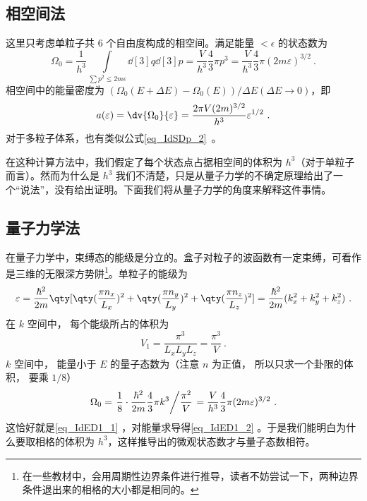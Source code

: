 
\subsection{相空间法}
这里只考虑单粒子共 $6$ 个自由度构成的相空间。满足能量 $<\epsilon$ 的状态数为
\begin{equation}\label{eq_IdED1_1}
\Omega_0 = \frac{1}{h^3}\int\limits_{\sum {p^2}  \leqslant 2m\epsilon} \dd[3]{q} \dd[3]{p}
 = \frac{V}{h^3}\frac43 \pi {p^3}
 = \frac{V}{h^3}\frac43 \pi (2m\varepsilon)^{3/2}~.
\end{equation}
相空间中的能量密度为 $(\Omega_0(E+\Delta E)-\Omega_0(E))/\Delta E(\Delta E\rightarrow 0)$，即
\begin{equation}\label{eq_IdED1_2}
a(\varepsilon) = \dv{\Omega_0}{\varepsilon} = \frac{2\pi V(2m)^{3/2}}{h^3} \varepsilon^{1/2}~.
\end{equation}
对于多粒子体系，也有类似公式\autoref{eq_IdSDp_2}~。

在这种计算方法中，我们假定了每个状态点占据相空间的体积为 $h^3$（对于单粒子而言）。然而为什么是 $h^3$ 我们不清楚，只是从量子力学的不确定原理给出了一个“说法”，没有给出证明。下面我们将从量子力学的角度来解释这件事情。
\subsection{量子力学法}
在量子力学中，束缚态的能级是分立的。盒子对粒子的波函数有一定束缚，可看作是三维的无限深方势阱\footnote{在一些教材中，会用周期性边界条件进行推导，读者不妨尝试一下，两种边界条件退出来的相格的大小都是相同的。}。单粒子的能级为
\begin{equation}
\varepsilon = \frac{\hbar ^2}{2m} \qty[\qty(\frac{\pi n_x}{L_x})^2 + \qty(\frac{\pi n_y}{L_y})^2 + \qty(\frac{\pi n_z}{L_z})^2] = \frac{\hbar ^2}{2m} (k_x^2 + k_y^2 + k_z^2)~.
\end{equation}
在 $k$ 空间中， 每个能级所占的体积为
\begin{equation}
V_1 = \frac{\pi^3}{L_x L_y L_z} = \frac{\pi^3}{V}~.
\end{equation}
$k$ 空间中， 能量小于 $E$ 的量子态数为（注意 $n$ 为正值， 所以只求一个卦限的体积， 要乘 $1/8$）
\begin{equation}
\Omega_0 = \left. \frac18\cdot \frac{\hbar^2}{2m}\frac43 \pi k^3 \middle/ \frac{\pi^2}{V} \right. = \frac{V}{h^3}\frac43 \pi(2m\varepsilon)^{3/2}~.
\end{equation}
这恰好就是\autoref{eq_IdED1_1} ，对能量求导得\autoref{eq_IdED1_2} 。于是我们能明白为什么要取相格的体积为 $h^3$，这样推导出的微观状态数才与量子态数相符。